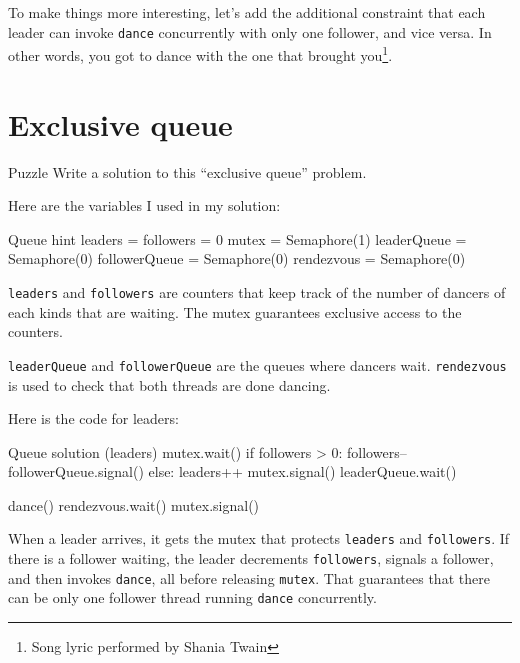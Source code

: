 To make things more interesting, let's add the additional constraint
that each leader can invoke {\tt dance} concurrently with only
one follower, and vice versa.  In other words, you got to dance
with the one that brought you\footnote{Song lyric performed by Shania
Twain}.

\section{Exclusive queue}
\begin{puzzlebox}{Puzzle}
Write a solution to this ``exclusive queue'' problem.


Here are the variables I used in my solution:

\begin{lstbox}{Queue hint}
leaders = followers = 0
mutex = Semaphore(1)
leaderQueue = Semaphore(0)
followerQueue = Semaphore(0)
rendezvous = Semaphore(0)
\end{lstbox}

{\tt leaders} and {\tt followers} are counters that
keep track of the number of dancers of each kinds that are
waiting.  The mutex guarantees exclusive access to the counters.

{\tt leaderQueue} and {\tt followerQueue} are the queues where
dancers wait.  {\tt rendezvous} is used to check that both threads
are done dancing.
\end{puzzlebox}




Here is the code for leaders:

\begin{lstbox}{Queue solution (leaders)}
mutex.wait()
if followers > 0:
    followers--
    followerQueue.signal()
else:
    leaders++
    mutex.signal()
    leaderQueue.wait()    

dance()
rendezvous.wait()
mutex.signal()
\end{lstbox}

When a leader arrives, it gets the mutex that protects {\tt leaders}
and {\tt followers}.  If there is a follower waiting, the leader
decrements {\tt followers}, signals a follower, and then invokes
{\tt dance}, all before releasing {\tt mutex}.  That guarantees that
there can be only one follower thread running {\tt dance}
concurrently.

